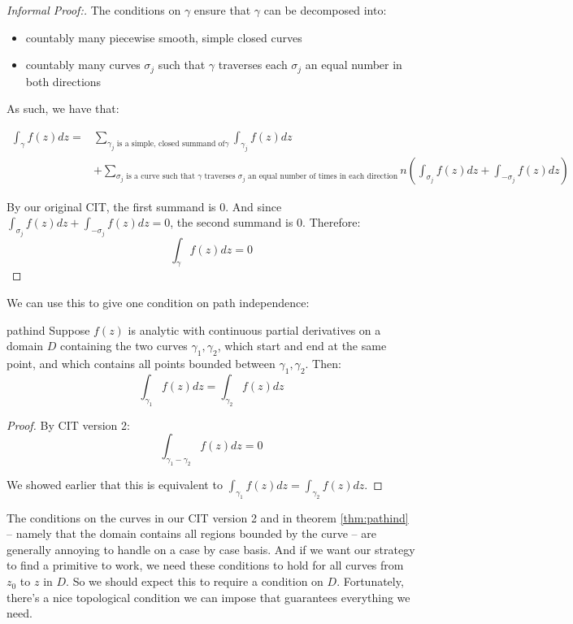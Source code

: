 \begin{proof}[Informal Proof:] The conditions on $\gamma$ ensure that $\gamma$ can be decomposed into:

\begin{itemize} 
\item countably many piecewise smooth, simple closed curves
\item countably many curves $\sigma_j$ such that $\gamma$ traverses each $\sigma_j$ an equal number in both directions
\end{itemize}

As such, we have that:

\begin{align*}\int_{\gamma}f(z)dz =& \sum_{\gamma_j \text{ is a simple, closed summand of} \gamma} \int_{\gamma_j}f(z)dz \\&+ \sum_{\sigma_j \text{ is a curve such that $\gamma$ traverses $\sigma_j$ an equal number of times in each direction}} n\left(\int_{\sigma_j} f(z)dz + \int_{-\sigma_j}f(z)dz\right)
\end{align*}

By our original CIT, the first summand is $0$. And since $\int_{\sigma_j}f(z)dz + \int_{-\sigma_j}f(z)dz = 0$, the second summand is $0$. Therefore:
$$\int_{\gamma}f(z)dz = 0$$

\end{proof}

We can use this to give one condition on path independence:

\begin{thmbo}{}{pathind} Suppose $f(z)$ is analytic with continuous partial derivatives on a domain $D$ containing the two curves $\gamma_1,\gamma_2$, which start and end at the same point, and which contains all points bounded between $\gamma_1,\gamma_2$. Then:
$$\int_{\gamma_1}f(z)dz = \int_{\gamma_2}f(z)dz$$
\end{thmbo}

\begin{proof} By CIT version 2:
$$\int_{\gamma_1 - \gamma_2}f(z)dz = 0$$

We showed earlier that this is equivalent to $\int_{\gamma_1}f(z)dz  =\int_{\gamma_2}f(z)dz$.
\end{proof}

The conditions on the curves in our CIT version 2 and in theorem \ref{thm:pathind} -- namely that the domain contains all regions bounded by the curve -- are generally annoying to handle on a case by case basis. And if we want our strategy to find a primitive to work, we need these conditions to hold for all curves from $z_0$ to $z$ in $D$. So we should expect this to require a condition on $D$. Fortunately, there's a nice topological condition we can impose that guarantees everything we need.

